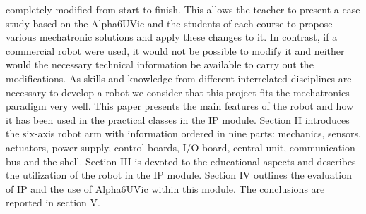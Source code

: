 completely modified from start to finish. This allows the
teacher to present a case study based on the Alpha6UVic and
the students of each course to propose various mechatronic
solutions and apply these changes to it. In contrast, if a
commercial robot were used, it would not be possible to
modify it and neither would the necessary technical
information be available to carry out the modifications. As
skills and knowledge from different interrelated disciplines are
necessary to develop a robot we consider that this project fits
the mechatronics paradigm very well. This paper presents the
main features of the robot and how it has been used in the
practical classes in the IP module. Section II introduces the
six-axis robot arm with information ordered in nine parts:
mechanics, sensors, actuators, power supply, control boards,
I/O board, central unit, communication bus and the shell.
Section III is devoted to the educational aspects and describes
the utilization of the robot in the IP module. Section IV
outlines the evaluation of IP and the use of Alpha6UVic
within this module. The conclusions are reported in section V.

